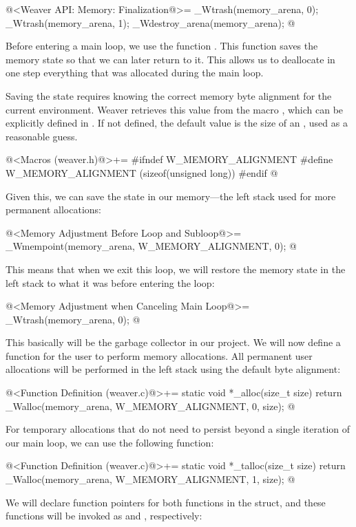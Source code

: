 \iniciocodigo
@<Weaver API: Memory: Finalization@>=
_Wtrash(memory_arena, 0);
_Wtrash(memory_arena, 1);
_Wdestroy_arena(memory_arena);
@
\fimcodigo

Before entering a main loop, we use the
function . This function saves the memory state
so that we can later return to it. This allows us to deallocate in one
step everything that was allocated during the main loop.

Saving the state requires knowing the correct memory byte alignment
for the current environment. Weaver retrieves this value from the
macro , which can be explicitly defined
in . If not defined, the default value is the
size of an , used as a reasonable guess.

\iniciocodigo
@<Macros (weaver.h)@>+=
#ifndef W_MEMORY_ALIGNMENT
#define W_MEMORY_ALIGNMENT (sizeof(unsigned long))
#endif
@
\fimcodigo

Given this, we can save the state in our memory---the left stack used
for more permanent allocations:

\iniciocodigo
@<Memory Adjustment Before Loop and Subloop@>=
_Wmempoint(memory_arena, W_MEMORY_ALIGNMENT, 0);
@
\fimcodigo

This means that when we exit this loop, we will restore the memory
state in the left stack to what it was before entering the loop:

\iniciocodigo
@<Memory Adjustment when Canceling Main Loop@>=
_Wtrash(memory_arena, 0);
@
\fimcodigo

This basically will be the garbage collector in our project. We will
now define a function for the user to perform memory allocations. All
permanent user allocations will be performed in the left stack using
the default byte alignment:

\iniciocodigo
@<Function Definition (weaver.c)@>+=
static void *_alloc(size_t size){
  return _Walloc(memory_arena, W_MEMORY_ALIGNMENT, 0, size);
}
@
\fimcodigo

For temporary allocations that do not need to persist beyond a single
iteration of our main loop, we can use the following function:

\iniciocodigo
@<Function Definition (weaver.c)@>+=
static void *_talloc(size_t size){
  return _Walloc(memory_arena, W_MEMORY_ALIGNMENT, 1, size);
}
@
\fimcodigo

We will declare function pointers for both functions in
the  struct, and these functions will be invoked
as  and , respectively:

